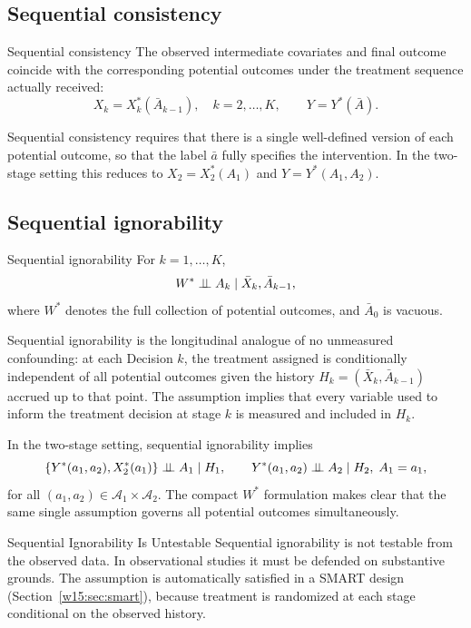 \documentclass[master.tex]{subfiles}
\begin{document}
\subsection{Sequential consistency}

\begin{defn}{Sequential consistency}
\label{w15:defn:seq-consistency}
The observed intermediate covariates and final outcome coincide with the corresponding potential outcomes under the treatment sequence actually received:
\[
X_k = X_k^*(\bar{A}_{k-1}), \quad k = 2,\ldots,K,
\qquad
Y = Y^*(\bar{A}).
\]
\end{defn}

Sequential consistency requires that there is a single well-defined version of each potential outcome, so that the label $\bar{a}$ fully specifies the intervention. In the two-stage setting this reduces to $X_2 = X_2^*(A_1)$ and $Y = Y^*(A_1,A_2)$.

\subsection{Sequential ignorability}

\begin{defn}{Sequential ignorability}
\label{w15:defn:seq-ignorability}
For $k = 1,\ldots,K$,
\[
W^* \perp\!\!\!\perp A_k \mid \bar{X}_k, \bar{A}_{k-1},
\]
where $W^*$ denotes the full collection of potential outcomes, and $\bar{A}_0$ is vacuous.
\end{defn}

Sequential ignorability is the longitudinal analogue of no unmeasured confounding: at each Decision $k$, the treatment assigned is conditionally independent of all potential outcomes given the history $H_k = (\bar{X}_k, \bar{A}_{k-1})$ accrued up to that point. The assumption implies that every variable used to inform the treatment decision at stage $k$ is measured and included in $H_k$.

In the two-stage setting, sequential ignorability implies
\[
\{Y^*(a_1,a_2), X_2^*(a_1)\} \perp\!\!\!\perp A_1 \mid H_1,
\qquad
Y^*(a_1,a_2) \perp\!\!\!\perp A_2 \mid H_2,\; A_1 = a_1,
\]
for all $(a_1,a_2) \in \mathcal{A}_1 \times \mathcal{A}_2$. The compact $W^*$ formulation makes clear that the same single assumption governs all potential outcomes simultaneously.

\begin{warn}{Sequential Ignorability Is Untestable}
Sequential ignorability is not testable from the observed data. In observational studies it must be defended on substantive grounds. The assumption is automatically satisfied in a SMART design (Section~\ref{w15:sec:smart}), because treatment is randomized at each stage conditional on the observed history.
\end{warn}
\end{document}
